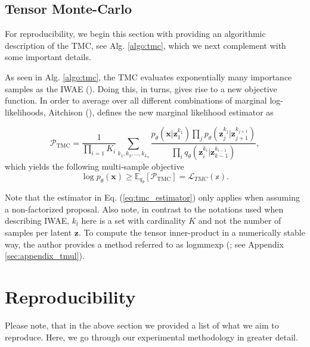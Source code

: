 \subsection{Tensor Monte-Carlo}
For reproducibility, we begin this section with providing an algorithmic description of the TMC, see Alg. \ref{algo:tmc}, which we next complement with some important details.



As seen in Alg. \ref{algo:tmc}, the TMC 
evaluates exponentially many importance samples as the IWAE (\cite{tmc, iwae}). Doing this, in turns, gives rise to a new objective function. In order to average over all different combinations of marginal log-likelihoods, Aitchison (\cite{tmc}), defines the new marginal likelihood estimator as

\begin{equation}
    \mathcal{P}_{\text{TMC}} = \frac{1}{\prod\limits_{i=1} K_i}
    \sum\limits_{k_1, k_2, ..., k_{L_q}} \frac{p_{\theta}(\bm x|\bm z^{k_1}_1)\prod_{j}p_{\theta}(\bm z^{k_j}_{j}|\bm z^{k_{j+1}}_{j+1})}
    {\prod\limits_i q_{\theta}(\bm z_i^{k_i}| \bm z_{k-1}^{k_{i-1}})},
    \label{eq:tmc_estimator}
\end{equation}
which yields the following multi-sample objective
\begin{equation}
    \log p_{\theta}(\bm x) \geq \mathbb E_{q_{\theta}} \left[\mathcal{P}_{\text{TMC}}\right] = \mathcal{L}_{TMC} (\mathbb x).
    \label{eq:tmc_loss}
\end{equation}

Note that the estimator in Eq. (\ref{eq:tmc_estimator}) only applies when assuming a non-factorized proposal. Also note, in contrast to the notations used when describing IWAE, $k_l$ here is a set with cardinality $K$ and not the number of samples per latent $\bm z$. To compute the tensor inner-product in a numerically stable way, the author provides a method referred to as logmmexp (\cite{tmc}; see Appendix \ref{sec:appendix_tmul}).



\section{Reproducibility}
Please note, that in the above section we provided a list of what we aim to reproduce.
Here, we go through our experimental methodology in greater detail. 





